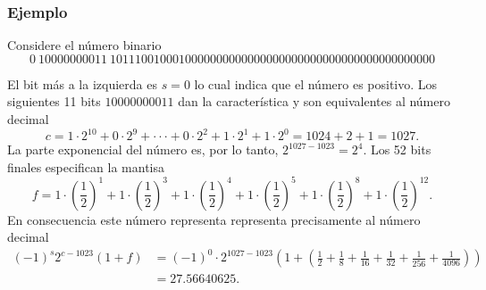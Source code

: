 \subsubsection*{Ejemplo}
Considere el número binario
\begin{equation*} %
    0 \ 10000000011 \ 1011100100010000000000000000000000000000000000000000
\end{equation*}

El bit más a la izquierda es $s=0$ lo cual indica que el número es positivo. Los siguientes 11 bits $10000000011$ dan la característica y son equivalentes al número decimal 
\begin{equation*} 
c=1\cdot2^{10}+0\cdot2^{9}+\cdot\cdot\cdot+0\cdot2^{2}+1\cdot2^{1}+1\cdot2^{0}=1024+2+1=1027.
\end{equation*}
La parte exponencial del número es, por lo tanto, $2^{1027-1023}=2^{4}$. Los 52 bits finales especifican la mantisa
\begin{equation*} 
f=1\cdot(\frac{1}{2})^{1}+1\cdot(\frac{1}{2})^{3}+1\cdot(\frac{1}{2})^{4}+1\cdot(\frac{1}{2})^{5}+1\cdot(\frac{1}{2})^{8}+1\cdot(\frac{1}{2})^{12}.
\end{equation*}
En consecuencia este número representa representa precisamente al número decimal
\begin{equation*} 
\begin{split}
(-1)^{s}2^{c-1023}(1+f) &= (-1)^{0}\cdot2^{1027-1023}(1+(\frac{1}{2}+\frac{1}{8}+\frac{1}{16}+\frac{1}{32}+\frac{1}{256}+\frac{1}{4096}))\\
&= 27.56640625.
\end{split}
\end{equation*}

\begin{comment}
\subsubsection*{Nota}
Los números ocupados en cálculos que tienen una magnitud menor a \\
\begin{equation*} 
2^{-1022}\cdot(1+0)
\end{equation*}\\
Resultan en ser despreciables y generalmente se toman como cero. Números más grandes que
\begin{equation*} 
2^{1023}\cdot(2-2^{-52})
\end{equation*}
Resultan en una saturación y típicamente causan que los cálculos se detengan.
\end{comment}

